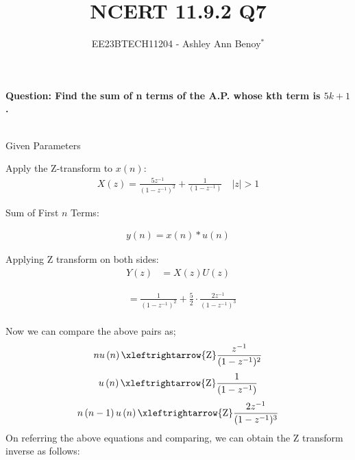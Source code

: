 \documentclass[journal,12pt,twocolumn]{IEEEtran}
\theoremstyle{remark}
\begin{document}
\providecommand{\brak}[1]{\ensuremath{\left(#1\right)}}

\vspace{3cm}

\title{NCERT 11.9.2 Q7}
\author{EE23BTECH11204 - Ashley Ann Benoy$^{*}$}%
\maketitle
\newpage
\bigskip

\textbf{Question: Find the sum of n terms of the A.P. whose kth term is \(5k + 1\).}\\
\solution
\fi
\begin{table}[h!]
    \centering
    \resizebox{6cm}{!}{
        
    }
    \\
    \caption{Given Parameters}
    \label{tab:given_params}  
\end{table}

Apply the Z-transform to \( x\brak{n} \):
\begin{align}
X\brak{z} = \frac{5z^{-1}}{\brak{1 - z^{-1}}^2} + \frac{1}{\brak{1 - z^{-1}}}
\quad |z|>1
\end{align}

Sum of First \( n \) Terms:

\begin{align}
y\brak{n} = x\brak{n} * u\brak{n}
\end{align}

Applying Z transform on both sides:
\begin{align}
    Y\brak{z} &= X\brak{z}U\brak{z}
\end{align}

\begin{align}
&=\frac{1}{\brak{1 - z^{-1}}^2} + \frac{5}{2} \cdot \frac{2z^{-1}}{\brak{1 - z^{-1}}^3} 
\end{align}
\\
Now we can compare the  above pairs as;
\begin{align}
nu\brak{n} \xleftrightarrow{\text{Z}} \frac{z^{-1}}{(1 - z^{-1})^2}
\end{align}
\begin{align}
u\brak{n} \xleftrightarrow{\text{Z}} \frac{1}{(1 - z^{-1})}
\end{align}
\begin{align}
n\brak{n-1}u\brak{n} \xleftrightarrow{\text{Z}} \frac{2z^{-1}}{(1 - z^{-1})^3}
\end{align}
On referring the above equations and comparing, we can obtain the  Z transform inverse as follows:
\end{document}
